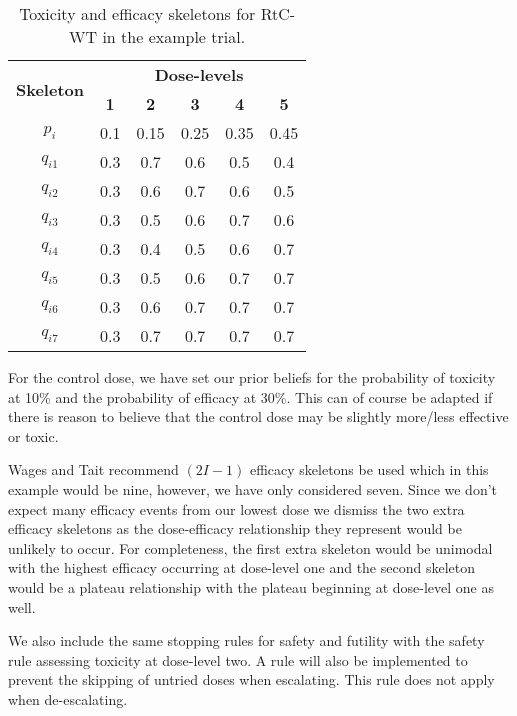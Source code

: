 \begin{table}[!h]
	\centering
	\caption{Toxicity and efficacy skeletons for RtC-WT in the example trial.}
	\label{tab_wt:tox-eff-skeleton}
	\begin{tabular}{c|ccccc}
		\hline
		\multicolumn{1}{c|}{\multirow{2}{*}{\textbf{Skeleton}}} & \multicolumn{5}{c}{\textbf{Dose-levels}}                       \\
		\multicolumn{1}{c|}{}                                   & \textbf{1} & \textbf{2} & \textbf{3} & \textbf{4} & \textbf{5} \\ \hline
		$p_i$    & 0.1 & 0.15 & 0.25 & 0.35 & 0.45 \\
		$q_{i1}$ & 0.3 & 0.7 & 0.6 & 0.5 & 0.4 \\
		$q_{i2}$ & 0.3 & 0.6 & 0.7 & 0.6 & 0.5 \\
		$q_{i3}$ & 0.3 & 0.5 & 0.6 & 0.7 & 0.6 \\
		$q_{i4}$ & 0.3 & 0.4 & 0.5 & 0.6 & 0.7 \\
		$q_{i5}$ & 0.3 & 0.5 & 0.6 & 0.7 & 0.7 \\
		$q_{i6}$ & 0.3 & 0.6 & 0.7 & 0.7 & 0.7 \\
		$q_{i7}$ & 0.3 & 0.7 & 0.7 & 0.7 & 0.7 \\ \hline
	\end{tabular}
\end{table}

For the control dose, we have set our prior beliefs for the probability of toxicity at 10\% and the probability of efficacy at 30\%. This can of course be adapted if there is reason to believe that the control dose may be slightly more/less effective or toxic. 

Wages and Tait recommend $(2I-1)$ efficacy skeletons be used which in this example would be nine, however, we have only considered seven. Since we don't expect many efficacy events from our lowest dose we dismiss the two extra efficacy skeletons as the dose-efficacy relationship they represent would be unlikely to occur. For completeness, the first extra skeleton would be unimodal with the highest efficacy occurring at dose-level one and the second skeleton would be a plateau relationship with the plateau beginning at dose-level one as well. 

We also include the same stopping rules for safety and futility with the safety rule assessing toxicity at dose-level two. A rule will also be implemented to prevent the skipping of untried doses when escalating. This rule does not apply when de-escalating. 

